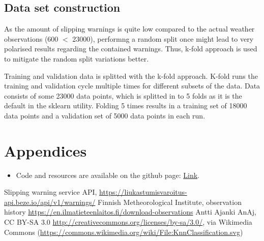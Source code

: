 \documentclass[12pt, a4paper]{report}
\begin{document}
    \subsection{Data set construction}
    As the amount of slipping warnings is quite low compared to the actual weather observations (600 $<$ 23000), performng a random split once might lead to 
    very polarised results regarding the contained warnings. Thus, k-fold approach is used to mitigate the random split variations better.

    Training and validation data is splitted with the k-fold approach. K-fold runs the training and validation cycle multiple times for different
    subsets of the data. Data consists of some 23000 data points, which is splitted in to 5 folds as it is the default in the sklearn utility. 
    Folding 5 times results in a training set of 18000 data points and a validation set of 5000 data points in each run.
    

    \section{Appendices}
    \begin{itemize}
      \item Code and resources are available on the github page: \href{https://github.com/aksun1/cs-c3240-ml-project}{Link}.
    \end{itemize}

    \newpage

    \begin{thebibliography}{9}
      Slipping warning service API, \href{https://liukastumisvaroitus-api.beze.io/api/v1/warnings/}{https://liukastumisvaroitus-api.beze.io/api/v1/warnings/}
      Finnish Metheorological Institute, observation history \href{https://en.ilmatieteenlaitos.fi/download-observations}{https://en.ilmatieteenlaitos.fi/download-observations}
      Antti Ajanki AnAj, CC BY-SA 3.0 \href{http://creativecommons.org/licenses/by-sa/3.0/}{http://creativecommons.org/licenses/by-sa/3.0/}, via Wikimedia Commons (\href{https://commons.wikimedia.org/wiki/File:KnnClassification.svg}{https://commons.wikimedia.org/wiki/File:KnnClassification.svg})
    \end{thebibliography}
\end{document}
